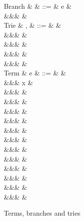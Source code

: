 \begin{figure}[H]
\begin{syntaxfig}
\mbox{Branch}
&
\kappa
&
::=
&
e
&
\\
&&&
\sigma
&
\\[2mm]
\mbox{Trie}
&
\sigma, \tau
&
::=
&
&
\\
&&&
\trieUnit{\kappa}
&
\\
&&&
\trieSum{\sigma}{\tau}
&
\\
&&&
\trieProd{\sigma}
&
\\
&&&
\trieRoll{\sigma}
&
\\[2mm]
\mbox{Term}
&
e
&
::=
&
&
\\
&&&
x
&
\\
&&&
\exUnit
&
\\
&&&
&
\\
&&&
&
\\
&&&
&
\\
&&&
&
\\
&&&
&
\\
&&&
&
\\
&&&
&
\\
&&&
\exFun{\sigma}
&
\\
&&&
&
\\
&&&
&
\\
&&&
&
\end{syntaxfig}
\caption{Terms, branches and tries}
\end{figure}
